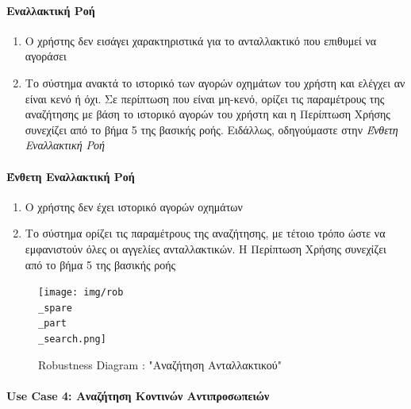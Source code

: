\documentclass{../ol-softwaremanual}
\begin{document}
	\paragraph{Εναλλακτική Ροή}
	
	\begin{enumerate}
		\item Ο χρήστης δεν εισάγει χαρακτηριστικά για το ανταλλακτικό που επιθυμεί να αγοράσει
		\item Το σύστημα ανακτά το ιστορικό των αγορών οχημάτων του χρήστη και ελέγχει αν είναι κενό ή όχι. Σε περίπτωση που είναι μη-κενό, ορίζει τις παραμέτρους της αναζήτησης με βάση το ιστορικό αγορών του χρήστη και η Περίπτωση Χρήσης συνεχίζει από το βήμα 5 της βασικής ροής. Ειδάλλως, οδηγούμαστε στην \textit{Ένθετη Εναλλακτική Ροή}	
	\end{enumerate}
	
	\paragraph{Ένθετη Εναλλακτική Ροή}
	\begin{enumerate}
		\item Ο χρήστης δεν έχει ιστορικό αγορών οχημάτων
		\item Το σύστημα ορίζει τις παραμέτρους της αναζήτησης, με τέτοιο τρόπο ώστε να εμφανιστούν όλες οι αγγελίες ανταλλακτικών. Η Περίπτωση Χρήσης συνεχίζει από το βήμα 5 της βασικής ροής
	\end{enumerate}
	
	
	\begin{figure}[htbp!]
		\texttt{[image: img/rob\\\_spare\\\_part\\\_search.png]}
		\caption{\en Robustness Diagram : "\gr Αναζήτηση Ανταλλακτικού\en"\gr}
	\end{figure}
	
	\newpage
	\centering
	\paragraph{\en Use Case 4: \gr Αναζήτηση Κοντινών Αντιπροσωπειών}	
	
\end{document}
